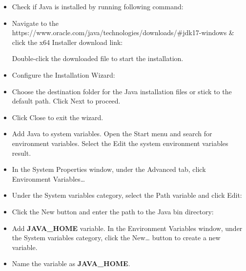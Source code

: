 \begin{flushleft}
\begin{itemize}
		\item Check if Java is installed by running following command:

		\item Navigate to the https://www.oracle.com/java/technologies/downloads/\#jdk17-windows  \& click the x64 Installer download link:
		
		Double-click the downloaded file to start the installation.
		\newpage
		\item Configure the Installation Wizard:
		
		\item Choose the destination folder for the Java installation files or stick to the default path. Click Next to proceed.
		
		\item Click Close to exit the wizard.
		
		\item Add Java to system variables. Open the Start menu and search for environment variables. Select the Edit the system environment variables result.
		\newpage		
		
		\item In the System Properties window, under the Advanced tab, click Environment Variables…

		
		\item Under the System variables category, select the Path variable and click Edit:
		
		\newpage
		\item Click the New button and enter the path to the Java bin directory:
		
		
		\item Add \textbf{\textbf{JAVA\_HOME}} variable. In the Environment Variables window, under the System variables category, click the New… button to create a new variable.

		
		\item Name the variable as \textbf{JAVA\_HOME}. 
		

\end{itemize}
\end{flushleft}
